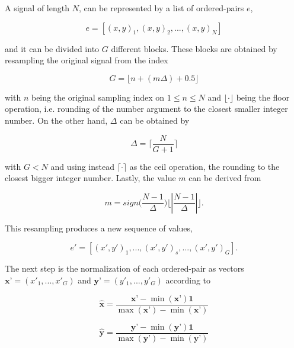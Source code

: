 \documentclass[brainsci,article,submit,moreauthors,pdftex,10pt,a4paper]{mdpi}
\begin{document}
A signal of length $N$, can be represented by a list of ordered-pairs $e$,

\begin{equation}
e = \left[ (x,y)_{1}, (x,y)_{2}, ..., (x,y)_{N} \right]
\label{eq:shccdelta}
\end{equation}

\noindent and it can be divided into $G$ different blocks.  These blocks are obtained by resampling the original signal from the index 

\begin{equation}
G = \lfloor n + ( m \Delta ) + 0.5 \rfloor
\label{eq:shcc2}
\end{equation}

\noindent with $n$ being the original sampling index on $ 1 \leq n \leq N $ and $\lfloor \cdot \rfloor$ being the floor operation, i.e. rounding of the number argument to the closest smaller integer number.  On the other hand, $\Delta$ can be obtained by

\begin{equation}
\Delta = \bigg \lceil \frac{N}{G+1} \bigg \rceil
\label{eq:shcc3}
\end{equation}

\noindent with $ G < N $ and using instead $\lceil \cdot \rceil$ as the ceil operation, the rounding to the closest bigger integer number. Lastly, the value $m$ can be derived from

\begin{equation}
m = sign \bigg (  \frac{N-1}{\Delta} \bigg )  \bigg \lfloor \left\lvert \frac{N-1}{\Delta} \right\lvert \bigg \rfloor.
\label{eq:shcc4}
\end{equation}

This resampling produces a new sequence of values,

\begin{equation}
e' = \left[ (x',y')_{1}, ...,(x',y')_{s}, ..., (x',y')_{G} \right].
\label{eq:shcc5}
\end{equation}

The next step is the normalization of each ordered-pair as vectors $\textbf{x'} = (x'_{1},...,x'_{G})$ and $\textbf{y'} = (y'_{1},...,y'_{G})$ according to

\begin{equation}
\hat{\textbf{x}} = \frac{\textbf{x'} - \min(\textbf{x'}) \textbf{1} }{\max(\textbf{x'}) - \min(\textbf{x'})} 
\label{eq:shcc6}
\end{equation}

\begin{equation}
\hat{\textbf{y}} = \frac{ \textbf{y'} - \min(\textbf{y'}) \textbf{1}}{\max(\textbf{y'}) - \min(\textbf{y'})} 
\label{eq:shcc7}
\end{equation}
\end{document}
